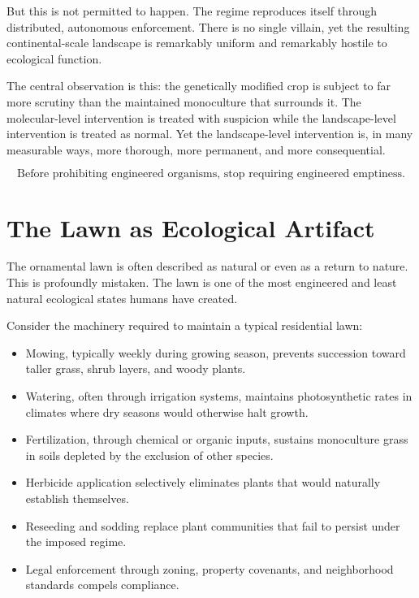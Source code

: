 \documentclass[12pt]{article}
\begin{document}
But this is not permitted to happen. The regime reproduces itself through distributed, autonomous enforcement. There is no single villain, yet the resulting continental-scale landscape is remarkably uniform and remarkably hostile to ecological function.

The central observation is this: the genetically modified crop is subject to far more scrutiny than the maintained monoculture that surrounds it. The molecular-level intervention is treated with suspicion while the landscape-level intervention is treated as normal. Yet the landscape-level intervention is, in many measurable ways, more thorough, more permanent, and more consequential.

\begin{equation}
\boxed{\text{Before prohibiting engineered organisms, stop requiring engineered emptiness.}}
\end{equation}

\section{The Lawn as Ecological Artifact}

The ornamental lawn is often described as natural or even as a return to nature. This is profoundly mistaken. The lawn is one of the most engineered and least natural ecological states humans have created.

Consider the machinery required to maintain a typical residential lawn:

\begin{itemize}
\item Mowing, typically weekly during growing season, prevents succession toward taller grass, shrub layers, and woody plants.
\item Watering, often through irrigation systems, maintains photosynthetic rates in climates where dry seasons would otherwise halt growth.
\item Fertilization, through chemical or organic inputs, sustains monoculture grass in soils depleted by the exclusion of other species.
\item Herbicide application selectively eliminates plants that would naturally establish themselves.
\item Reseeding and sodding replace plant communities that fail to persist under the imposed regime.
\item Legal enforcement through zoning, property covenants, and neighborhood standards compels compliance.
\end{itemize}
\end{document}
